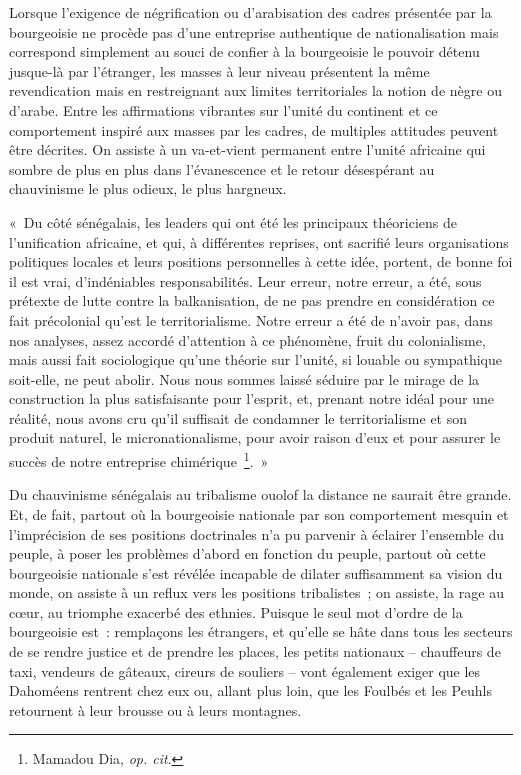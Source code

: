 \documentclass[french,twoside]{book} %
\begin{document}
 Lorsque l’exigence de négrification ou d’arabisation des cadres présentée par la bourgeoisie ne procède pas d’une entreprise authentique de nationalisation mais correspond simplement au souci de confier à la bourgeoisie le pouvoir détenu jusque-là par l’étranger, les masses à leur niveau présentent la même revendication mais en restreignant aux limites territoriales la notion de nègre ou d’arabe. Entre les affirmations vibrantes sur l’unité du continent et ce comportement inspiré aux masses par les cadres, de multiples attitudes peuvent être décrites. On assiste à un va-et-vient permanent entre l’unité africaine qui sombre de plus en plus dans l’évanescence et le retour désespérant au chauvinisme le plus odieux, le plus hargneux.\par
« Du côté sénégalais, les leaders qui ont été les principaux théoriciens de l’unification africaine, et qui, à différentes reprises, ont sacrifié leurs organisations politiques locales et leurs positions personnelles à cette idée, portent, de bonne foi il est vrai, d’indéniables responsabilités. Leur erreur, notre erreur, a été, sous prétexte de lutte contre la balkanisation, de ne pas prendre en considération ce fait précolonial qu’est le territorialisme. Notre erreur a été de n’avoir pas, dans nos analyses, assez accordé d’attention à ce phénomène, fruit du colonialisme, mais aussi fait sociologique qu’une théorie sur l’unité, si louable ou sympathique soit-elle, ne peut abolir. Nous nous sommes laissé séduire par le mirage de la construction la plus satisfaisante pour l’esprit, et, prenant notre idéal pour une réalité, nous avons cru qu’il suffisait de condamner le territorialisme et son produit naturel, le micronationalisme, pour avoir raison d’eux et pour assurer le succès de notre entreprise chimérique \footnote{Mamadou Dia, \emph{op. cit}.}. »\par
Du chauvinisme sénégalais au tribalisme ouolof la distance ne saurait être grande. Et, de fait, partout où la bourgeoisie nationale par son comportement mesquin et l’imprécision de ses positions doctrinales n’a pu parvenir à éclairer l’ensemble du peuple, à poser les problèmes d’abord en fonction du peuple,   partout où cette bourgeoisie nationale s’est révélée incapable de dilater suffisamment sa vision du monde, on assiste à un reflux vers les positions tribalistes ; on assiste, la rage au cœur, au triomphe exacerbé des ethnies. Puisque le seul mot d’ordre de la bourgeoisie est : remplaçons les étrangers, et qu’elle se hâte dans tous les secteurs de se rendre justice et de prendre les places, les petits nationaux – chauffeurs de taxi, vendeurs de gâteaux, cireurs de souliers – vont également exiger que les Dahoméens rentrent chez eux ou, allant plus loin, que les Foulbés et les Peuhls retournent à leur brousse ou à leurs montagnes.\par
\end{document}
